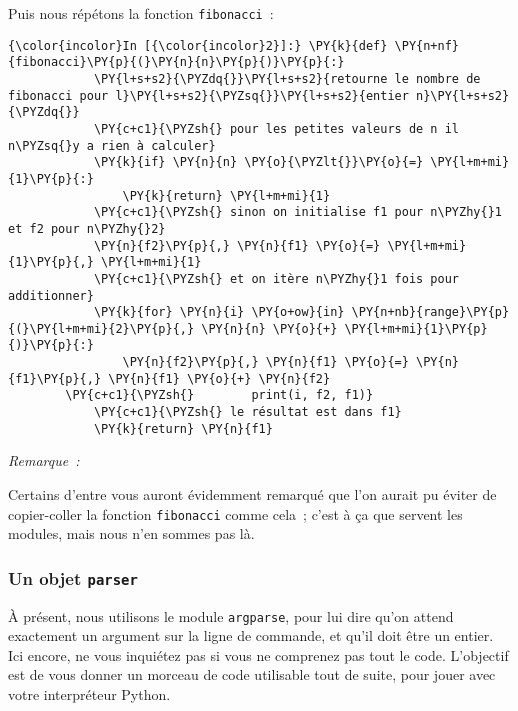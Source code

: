     Puis nous répétons la fonction \texttt{fibonacci}~:

    \begin{Verbatim}[commandchars=\\\{\},frame=single,framerule=0.3mm,rulecolor=\color{cellframecolor}]
{\color{incolor}In [{\color{incolor}2}]:} \PY{k}{def} \PY{n+nf}{fibonacci}\PY{p}{(}\PY{n}{n}\PY{p}{)}\PY{p}{:}
            \PY{l+s+s2}{\PYZdq{}}\PY{l+s+s2}{retourne le nombre de fibonacci pour l}\PY{l+s+s2}{\PYZsq{}}\PY{l+s+s2}{entier n}\PY{l+s+s2}{\PYZdq{}}
            \PY{c+c1}{\PYZsh{} pour les petites valeurs de n il n\PYZsq{}y a rien à calculer}
            \PY{k}{if} \PY{n}{n} \PY{o}{\PYZlt{}}\PY{o}{=} \PY{l+m+mi}{1}\PY{p}{:}
                \PY{k}{return} \PY{l+m+mi}{1}
            \PY{c+c1}{\PYZsh{} sinon on initialise f1 pour n\PYZhy{}1 et f2 pour n\PYZhy{}2}
            \PY{n}{f2}\PY{p}{,} \PY{n}{f1} \PY{o}{=} \PY{l+m+mi}{1}\PY{p}{,} \PY{l+m+mi}{1}
            \PY{c+c1}{\PYZsh{} et on itère n\PYZhy{}1 fois pour additionner}
            \PY{k}{for} \PY{n}{i} \PY{o+ow}{in} \PY{n+nb}{range}\PY{p}{(}\PY{l+m+mi}{2}\PY{p}{,} \PY{n}{n} \PY{o}{+} \PY{l+m+mi}{1}\PY{p}{)}\PY{p}{:}
                \PY{n}{f2}\PY{p}{,} \PY{n}{f1} \PY{o}{=} \PY{n}{f1}\PY{p}{,} \PY{n}{f1} \PY{o}{+} \PY{n}{f2}
        \PY{c+c1}{\PYZsh{}        print(i, f2, f1)}
            \PY{c+c1}{\PYZsh{} le résultat est dans f1}
            \PY{k}{return} \PY{n}{f1}
\end{Verbatim}


    \emph{Remarque~:}

Certains d'entre vous auront évidemment remarqué que l'on aurait pu
éviter de copier-coller la fonction \texttt{fibonacci} comme cela~;
c'est à ça que servent les modules, mais nous n'en sommes pas là.

    \hypertarget{un-objet-parser}{%
\subsubsection{\texorpdfstring{Un objet
\texttt{parser}}{Un objet parser}}\label{un-objet-parser}}

    À présent, nous utilisons le module \texttt{argparse}, pour lui dire
qu'on attend exactement un argument sur la ligne de commande, et qu'il
doit être un entier. Ici encore, ne vous inquiétez pas si vous ne
comprenez pas tout le code. L'objectif est de vous donner un morceau de
code utilisable tout de suite, pour jouer avec votre interpréteur
Python.

